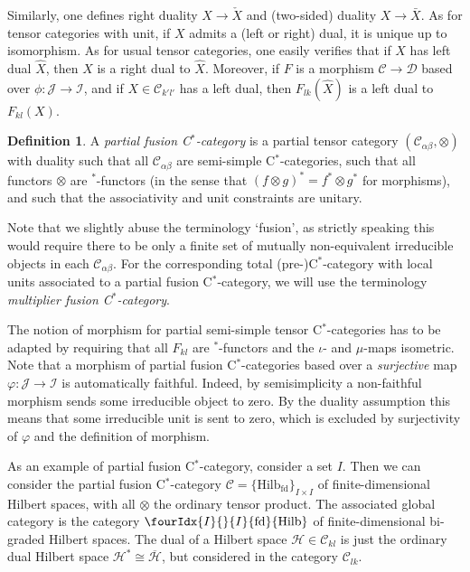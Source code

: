 \documentclass[10pt]{article}
\DeclareMathOperator{\fin}{\mathrm{fd}}
\newcommand{\Hsp}{\mathcal{H}}
\newcommand{\CatC}{\mathcal{C}}
\newcommand{\CatCC}{\mathscr{C}}
\newcommand{\CatDD}{\mathscr{D}}
\newcommand{\Hilb}{\mathrm{Hilb}}
\newcommand{\Hilbif}{\Gr{\mathrm{Hilb}}{I}{I}{}{\fin}}
\newcommand{\Gr}[5]{\fourIdx{#2}{#4}{#3}{#5}{#1}}%
\theoremstyle{definition}
\newtheorem{Def}[Theorem]{Definition}
\numberwithin{equation}{section}
\begin{document}
Similarly, one defines right duality $X\rightarrow \check{X}$ and (two-sided) duality $X\rightarrow \bar{X}$. As for tensor categories with unit, if $X$ admits a (left or right) dual, it is unique up to isomorphism. As for usual tensor categories, one easily verifies that if $X$ has left dual $\hat{X}$, then $X$ is a right dual to $\hat{X}$. Moreover, if $F$ is a morphism $\CatCC\rightarrow \CatDD$ based over $\phi:\mathscr{J}\rightarrow \mathscr{I}$, and if $X\in \CatC_{k'l'}$ has a left dual, then $F_{lk}(\hat{X})$ is a left dual to $F_{kl}(X)$.

\begin{Def}\label{DefParFus} A \emph{partial fusion C$^*$-category} is a partial tensor category $(\CatC_{\alpha\beta},\otimes)$ with duality such that all $\CatC_{\alpha\beta}$ are semi-simple C$^*$-categories, such that all functors $\otimes$ are $^*$-functors (in the sense that $(f\otimes g)^* = f^*\otimes g^*$ for morphisms), and such that the associativity and unit constraints are unitary.
\end{Def} 

Note that we slightly abuse the terminology `fusion', as strictly speaking this would require there to be only a finite set of mutually non-equivalent irreducible objects in each $\CatC_{\alpha\beta}$. For the corresponding total (pre-)C$^*$-category with local units associated to a partial fusion C$^*$-category, we will use the terminology \emph{multiplier fusion C$^*$-category}.

The notion of morphism for partial semi-simple tensor C$^*$-categories has to be adapted by requiring that all $F_{kl}$ are $^*$-functors and the $\iota$- and $\mu$-maps isometric.  Note that a morphism of partial fusion C$^*$-categories based over a \emph{surjective} map $\varphi: \mathscr{J}\rightarrow \mathscr{I}$ is automatically faithful. Indeed, by semisimplicity a non-faithful morphism sends some irreducible object to zero. By the duality assumption this means that some irreducible unit is sent to zero, which is excluded by surjectivity of $\varphi$ and the definition of morphism.

As an example of partial fusion C$^*$-category, consider a set  $I$. Then we can consider the partial fusion C$^*$-category $\CatCC = \{\Hilb_{\fin}\}_{I\times I}$ of finite-dimensional Hilbert spaces, with all $\otimes$ the ordinary tensor product. The associated global category is the category $\Hilbif$ of finite-dimensional bi-graded Hilbert spaces. The dual of a Hilbert space $\Hsp \in \CatC_{kl}$ is just the ordinary dual Hilbert space $\Hsp^* \cong \overline{\Hsp}$, but considered in the category $\CatC_{lk}$. 
\end{document}
